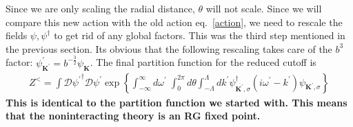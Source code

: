 \documentclass[14pt]{extarticle}
\begin{document}
Since we are only scaling the radial distance, \(\theta\) will not scale. Since we will compare this new action with the old action eq.~\ref{action}, we need to rescale the fields \(\psi,\psi^\dagger\) to get rid of any global factors. This was the third step mentioned in the previous section. Its obvious that the following rescaling takes care of the \(b^3\) factor: \(\psi^\prime_{\mathbf{K}^\prime} = b^{-\frac{3}{2}}\psi_\mathbf{K}\). The final partition function for the reduced cutoff is
\begin{equation}\begin{aligned}
	Z^< = \int \mathcal{D}{\psi^\prime}^\dagger \mathcal{D}{\psi^\prime}\exp\left\{\int_{-\infty}^\infty d\omega^\prime\;\int_0^{2\pi} d\theta \int_{-\Lambda}^{\Lambda}dk^\prime\psi_{\mathbf K^\prime,\sigma}^\dagger \left(i\omega^\prime - k^\prime\right)\psi_{\mathbf K^\prime,\sigma}\right\}
\end{aligned}\end{equation}
\textbf{This is identical to the partition function we started with. This means that the noninteracting theory is an RG fixed point.}
\end{document}
